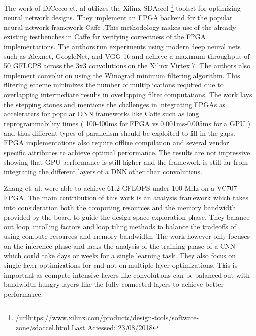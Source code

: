 The work of DiCecco et. al \cite{caffeinated} utilizes the Xilinx SDAccel \footnote{/url{https://www.xilinx.com/products/design-tools/software-zone/sdaccel.html} Last Accessed: 23/08/2018 } toolset for optimizing neural network designs. They implement an FPGA backend for the popular neural network framework Caffe \cite{caffe}.This methodology makes use of the already existing testbenches in Caffe for verifying correctness of the FPGA implementations. The authors run experiments using modern deep neural nets such as Alexnet, GoogleNet, and VGG-16 and achieve a maximum throughput of 50 GFLOPS across the 3x3 convolutions on the Xilinx Virtex 7. The authors also implement convolution using the Winograd \cite{lavin2016fast} minimum filtering algorithm. This filtering scheme minimizes the number of multiplications required due to overlapping intermediate results in overlapping filter computations. The work lays the stepping stones and mentions the challenges in integrating FPGAs as accelerators for popular DNN frameworks like Caffe such as long reprogrammability times ( 100-400ms for FPGA vs 0,001ms-0.005ms for a GPU ) and thus different types of parallelism should be exploited to fill in the gaps. FPGA implementations also require offline compilation and several vendor specific attributes to achieve optimal performance. The results are not impressive showing that GPU performance is still higher and the framework is still far from integrating the different layers of a DNN other than convolutions.

Zhang et. al.\cite{Zhang2015} were able to achieve 61.2 GFLOPS under 100 MHz on a VC707 FPGA. The main contribution of this work is an analysis framework which takes into consideration both the computing resources and the memory bandwidth provided by the board to guide the design space exploration phase. They balance out loop unrolling factors and loop tiling methods to balance the tradeoffs of using compute resources and memory bandwidth. The work however only focuses on the inference phase and lacks the analysis of the training phase of a CNN which could take days or weeks for a single learning task. They also focus on single layer optimizations for and not on multiple layer optimizations. This is important as compute intensive layers like convolutions can be balanced out with bandwidth hungry layers like the fully connected layers to achieve better performance. 




